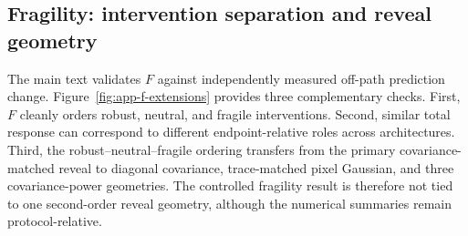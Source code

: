 \subsection{Fragility: intervention separation and reveal geometry}
\label{app:f-extensions}

The main text validates $F$ against independently measured off-path prediction change. Figure~\ref{fig:app-f-extensions} provides three complementary checks. First, $F$ cleanly orders robust, neutral, and fragile interventions. Second, similar total response can correspond to different endpoint-relative roles across architectures. Third, the robust--neutral--fragile ordering transfers from the primary covariance-matched reveal to diagonal covariance, trace-matched pixel Gaussian, and three covariance-power geometries. The controlled fragility result is therefore not tied to one second-order reveal geometry, although the numerical summaries remain protocol-relative.


